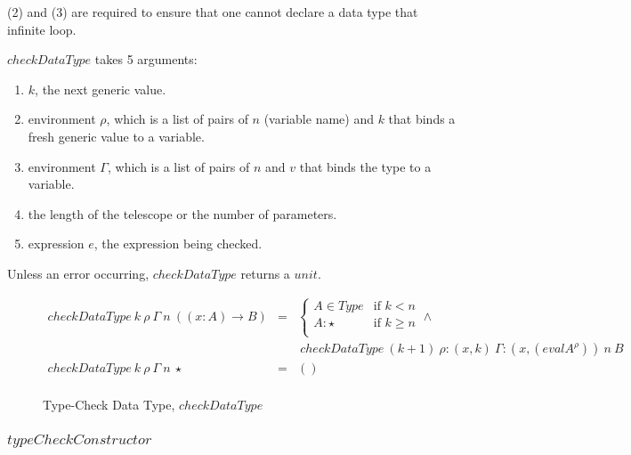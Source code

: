 (2) and (3) are required to ensure that one cannot declare a data type that infinite loop.

$checkDataType$ takes 5 arguments:

\begin{enumerate}
  \item $k$, the next generic value.
  \item environment $\rho$, which is a list of pairs of $n$ (variable name) and $k$ that binds a fresh generic value to a variable.
  \item environment $\Gamma$, which is a list of pairs of $n$ and $v$ that binds the type to a variable.
  \item the length of the telescope or the number of parameters.
  \item expression $e$, the expression being checked.
\end{enumerate}

Unless an error occurring, $checkDataType$ returns a $unit$.

\begin{figure}[H]
  \begin{equation*}
    \begin{aligned}
      checkDataType \: k \: \rho \: \Gamma \: n \: ((x:A) \to B) & = &
      \begin{cases}
        A \in Type & \text{if } k < n    \\
        A : \star  & \text{if } k \geq n \\
      \end{cases}                                                                                                                                 \land \\
                                                                 &   & \: checkDataType \: (k+1) \: \rho : (x,k) \: \Gamma : (x, (eval A^{\rho})) \: n \: B            \\
      checkDataType \: k \: \rho \: \Gamma \: n \: \star         & = & ()                                                                                              \\
    \end{aligned}
  \end{equation*}
  \caption{Type-Check Data Type, $checkDataType$}
\end{figure}

\subsubsection{$typeCheckConstructor$}

